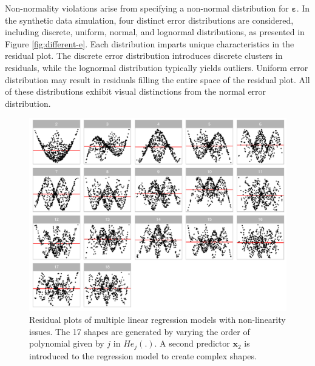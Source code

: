 \documentclass[]{interact}
\theoremstyle{plain}%
\theoremstyle{definition}
\theoremstyle{remark}
\begin{document}
Non-normality violations arise from specifying a non-normal distribution
for \(\boldsymbol{\varepsilon}\). In the synthetic data simulation, four
distinct error distributions are considered, including discrete,
uniform, normal, and lognormal distributions, as presented in Figure
\ref{fig:different-e}. Each distribution imparts unique characteristics
in the residual plot. The discrete error distribution introduces
discrete clusters in residuals, while the lognormal distribution
typically yields outliers. Uniform error distribution may result in
residuals filling the entire space of the residual plot. All of these
distributions exhibit visual distinctions from the normal error
distribution.

\begin{figure}[!h]

{\centering \includegraphics[width=1\linewidth]{appendix_files/figure-latex/different-j-x2-1} 

}

\caption{Residual plots of multiple linear regression models with non-linearity issues. The 17 shapes are generated by varying the order of polynomial given by $j$ in $He_j(.)$. A second predictor $\boldsymbol{x}_2$ is introduced to the regression model to create complex shapes.}\label{fig:different-j-x2}
\end{figure}
\end{document}
